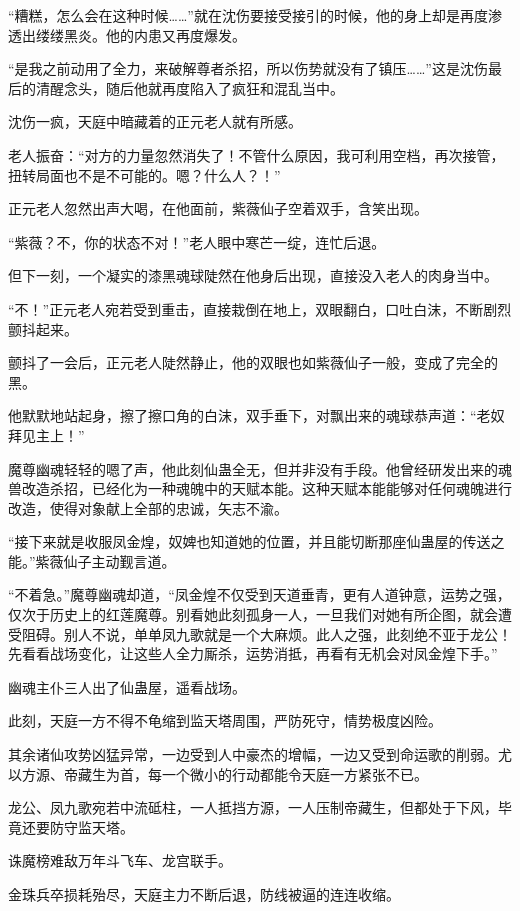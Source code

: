 \begin{this_body}
“糟糕，怎么会在这种时候……”就在沈伤要接受接引的时候，他的身上却是再度渗透出缕缕黑炎。他的内患又再度爆发。

“是我之前动用了全力，来破解尊者杀招，所以伤势就没有了镇压……”这是沈伤最后的清醒念头，随后他就再度陷入了疯狂和混乱当中。

沈伤一疯，天庭中暗藏着的正元老人就有所感。

老人振奋：“对方的力量忽然消失了！不管什么原因，我可利用空档，再次接管，扭转局面也不是不可能的。嗯？什么人？！”

正元老人忽然出声大喝，在他面前，紫薇仙子空着双手，含笑出现。

“紫薇？不，你的状态不对！”老人眼中寒芒一绽，连忙后退。

但下一刻，一个凝实的漆黑魂球陡然在他身后出现，直接没入老人的肉身当中。

“不！”正元老人宛若受到重击，直接栽倒在地上，双眼翻白，口吐白沫，不断剧烈颤抖起来。

颤抖了一会后，正元老人陡然静止，他的双眼也如紫薇仙子一般，变成了完全的黑。

他默默地站起身，擦了擦口角的白沫，双手垂下，对飘出来的魂球恭声道：“老奴拜见主上！”

魔尊幽魂轻轻的嗯了声，他此刻仙蛊全无，但并非没有手段。他曾经研发出来的魂兽改造杀招，已经化为一种魂魄中的天赋本能。这种天赋本能能够对任何魂魄进行改造，使得对象献上全部的忠诚，矢志不渝。

“接下来就是收服凤金煌，奴婢也知道她的位置，并且能切断那座仙蛊屋的传送之能。”紫薇仙子主动觐言道。

“不着急。”魔尊幽魂却道，“凤金煌不仅受到天道垂青，更有人道钟意，运势之强，仅次于历史上的红莲魔尊。别看她此刻孤身一人，一旦我们对她有所企图，就会遭受阻碍。别人不说，单单凤九歌就是一个大麻烦。此人之强，此刻绝不亚于龙公！先看看战场变化，让这些人全力厮杀，运势消抵，再看有无机会对凤金煌下手。”

幽魂主仆三人出了仙蛊屋，遥看战场。

此刻，天庭一方不得不龟缩到监天塔周围，严防死守，情势极度凶险。

其余诸仙攻势凶猛异常，一边受到人中豪杰的增幅，一边又受到命运歌的削弱。尤以方源、帝藏生为首，每一个微小的行动都能令天庭一方紧张不已。

龙公、凤九歌宛若中流砥柱，一人抵挡方源，一人压制帝藏生，但都处于下风，毕竟还要防守监天塔。

诛魔榜难敌万年斗飞车、龙宫联手。

金珠兵卒损耗殆尽，天庭主力不断后退，防线被逼的连连收缩。


\end{this_body}
